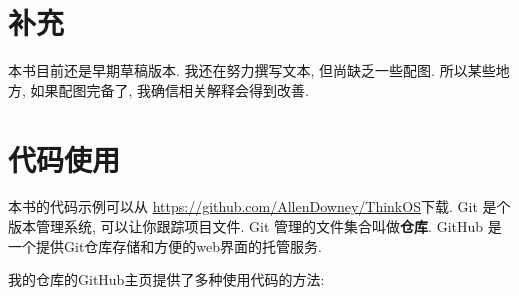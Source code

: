 \documentclass[12pt]{book}
\begin{document}
\section*{补充}

本书目前还是早期草稿版本. 
我还在努力撰写文本, 但尚缺乏一些配图.
所以某些地方, 如果配图完备了, 我确信相关解释会得到改善.

\section{代码使用}
\label{code}

本书的代码示例可以从
\url{https://github.com/AllenDowney/ThinkOS}下载.  
Git 是个版本管理系统, 可以让你跟踪项目文件. 
Git 管理的文件集合叫做{\bf 仓库}.
GitHub 是一个提供Git仓库存储和方便的web界面的托管服务.

我的仓库的GitHub主页提供了多种使用代码的方法:
\end{document}
